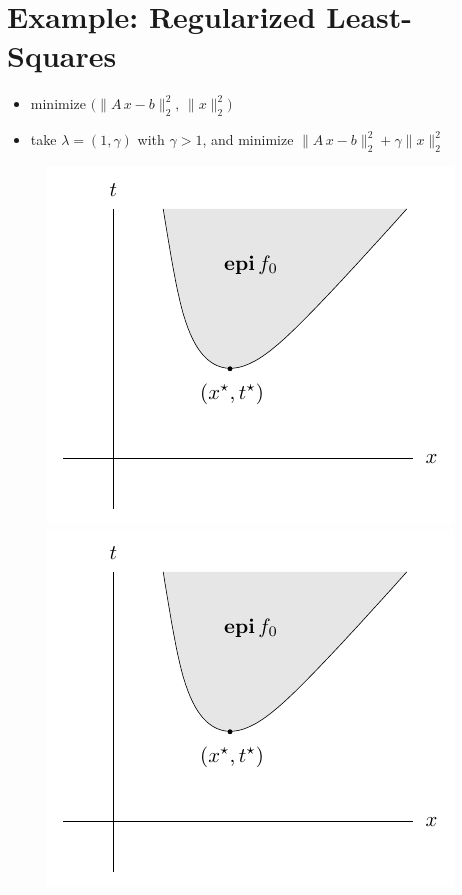 \documentclass[11pt]{extarticle}
\newcommand{\ds}{\displaystyle}
\theoremstyle{definition}
\begin{document}
\section*{Example: Regularized Least-Squares}
\begin{itemize}
  \item minimize $\ds\big(\|A\,x - b\|^2_2,\,\|x\|^2_2\big)$ 
  \item take $\ds\lambda = (1, \gamma)$ with $\gamma > 1$, and minimize $\ds\|A\,x - b\|^2_2 + \gamma\|x\|^2_2$
\end{itemize}
\begin{figure}[!htbp]
  \centering
  \includegraphics[scale=0.7,page=9]{fig/04.pdf}
  \includegraphics[scale=0.6,page=11]{fig/04.pdf}
\end{figure}
\end{document}
